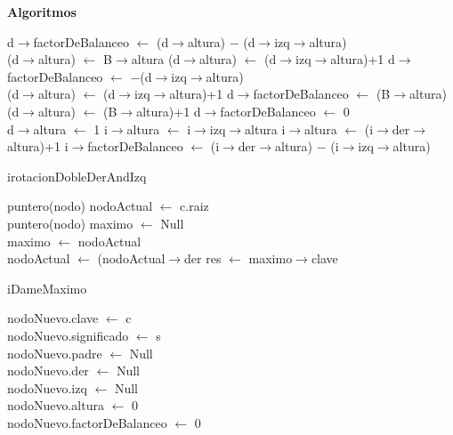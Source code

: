 \documentclass[a4paper,10pt]{article}
\newenvironment{Algoritmos}{%
  \vspace*{2ex}%
  \noindent\textbf{\Large Algoritmos}%
  \vspace*{2ex}%
}{}
\begin{document}
\begin{Algoritmos}
\begin{algorithm}[H]
{
{
{d$\rightarrow$factorDeBalanceo $\leftarrow$ (d$\rightarrow$altura) $-$  (d$\rightarrow$izq$\rightarrow$altura)  \\
{
{(d$\rightarrow$altura) $\leftarrow$ B$\rightarrow$altura}
{(d$\rightarrow$altura) $\leftarrow$ (d$\rightarrow$izq$\rightarrow$altura)+1}
}
}
{d$\rightarrow$factorDeBalanceo $\leftarrow$ $-$(d$\rightarrow$izq$\rightarrow$altura) \\
(d$\rightarrow$altura) $\leftarrow$ (d$\rightarrow$izq$\rightarrow$altura)+1
}
}
{
{d$\rightarrow$factorDeBalanceo $\leftarrow$ (B$\rightarrow$altura)\\
(d$\rightarrow$altura) $\leftarrow$ (B$\rightarrow$altura)+1}
{d$\rightarrow$factorDeBalanceo $\leftarrow$ 0\\
 d$\rightarrow$altura $\leftarrow$ 1}
}
{
{i$\rightarrow$altura $\leftarrow$ i$\rightarrow$izq$\rightarrow$altura}
{i$\rightarrow$altura $\leftarrow$   (i$\rightarrow$der$\rightarrow$altura)+1}
}
{i$\rightarrow$factorDeBalanceo $\leftarrow$ (i$\rightarrow$der$\rightarrow$altura) $-$ (i$\rightarrow$izq$\rightarrow$altura) \\}
}
\caption{irotacionDobleDerAndIzq}
\end{algorithm}

\newpage
{}
\newline
\begin{algorithm}[H]
{ puntero(nodo) nodoActual $\leftarrow$ c.raiz\\}
{puntero(nodo) maximo $\leftarrow$ Null\\}
{maximo $\leftarrow$ nodoActual\\
nodoActual $\leftarrow$ (nodoActual$\rightarrow$der}
{res $\leftarrow$ maximo$\rightarrow$clave \\}
 \caption{iDameMaximo}
\end{algorithm}


\newline
\begin{algorithm}[H]
{nodoNuevo.clave $\leftarrow$ c\\}
{nodoNuevo.significado $\leftarrow$ s\\}
{nodoNuevo.padre $\leftarrow$ Null\\}
{nodoNuevo.der $\leftarrow$ Null\\}
{nodoNuevo.izq $\leftarrow$ Null\\}
{nodoNuevo.altura $\leftarrow$ 0\\}
{nodoNuevo.factorDeBalanceo $\leftarrow$ 0\\}
\end{algorithm}


\end{Algoritmos}
\end{document}
